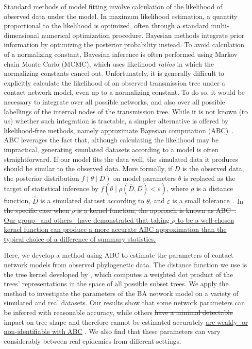 \documentclass[12pt]{article}\usepackage[]{graphicx}\usepackage[]{color}
\newcommand{\add}[1]{\color{blue} \uline{#1} \color{black}}
\newcommand{\del}[1]{\color{red} \sout{#1} \color{black}}
\begin{document}
Standard methods of model fitting involve calculation of the likelihood of
observed data under the model. In maximum likelihood estimation, a quantity
proportional to the likelihood is optimized, often through a standard
multi-dimensional numerical optimization procedure. Bayesian methods integrate
prior information by optimizing the posterior probability instead. To avoid
calculation of a normalizing constant, Bayesian inference is often performed
using Markov chain Monte Carlo (MCMC), which uses likelihood \emph{ratios} in
which the normalizing constants cancel out. Unfortunately, it is generally
difficult to explicitly calculate the likelihood of an observed transmission
tree under a contact network model, even up to a normalizing constant. To do
so, it would be necessary to integrate over all possible networks, and also
over all possible labellings of the internal nodes of the transmission tree.
While it is not known (to us) whether such integration is tractable, a simpler
alternative is offered by likelihood-free methods, namely approximate Bayesian
computation (ABC)~\autocite{tavare1997inferring, beaumont2002approximate}. ABC
leverages the fact that, although calculating the likelihood may be
impractical, generating simulated datasets according to a model is often
straightforward. If our model fits the data well, the simulated data it
produces should be similar to the observed data. More formally, if $D$ is the
observed data, the posterior distribution $f(\theta \mid D)$ on model
parameters $\theta$ is replaced as the target of statistical inference by
$f(\theta \mid \rho(\hat{D}, D) < \varepsilon)$, where $\rho$ is a distance
function, $\hat{D}$ is a simulated dataset according to $\theta$, and
$\varepsilon$ is a small tolerance~\autocite{sunnaaker2013approximate}. \del{In
the specific case when $\rho$ is a kernel function, the approach is known as
ABC~\autocite{nakagome2013kernel, poon2015phylodynamic}.} \add{Our
group~\autocite{poon2015phylodynamic} and others~\autocite{park2015k2} have
demonstrated that taking $\rho$ to be a well-chosen kernel function can produce
a more accurate ABC approximation than the typical choice of a difference of
summary statistics.}

Here, we develop a method using ABC to estimate the parameters of contact
network models from observed phylogenetic data. The distance function we use is
the tree kernel developed by \textcite{poon2013mapping}, which computes a
weighted dot product of the trees' representations in the space of all possible
subset trees. We apply the method to investigate the parameters of the BA
network model on a variety of simulated and real datasets. Our results show
that some network parameters can be inferred with reasonable accuracy, while
others \del{have a minimal detectable impact on tree shape and therefore cannot
be estimated accurately}\add{are weakly- or non-identifiable with ABC}. We also
find that these parameters can vary considerably between real epidemics from
different settings.
\end{document}
